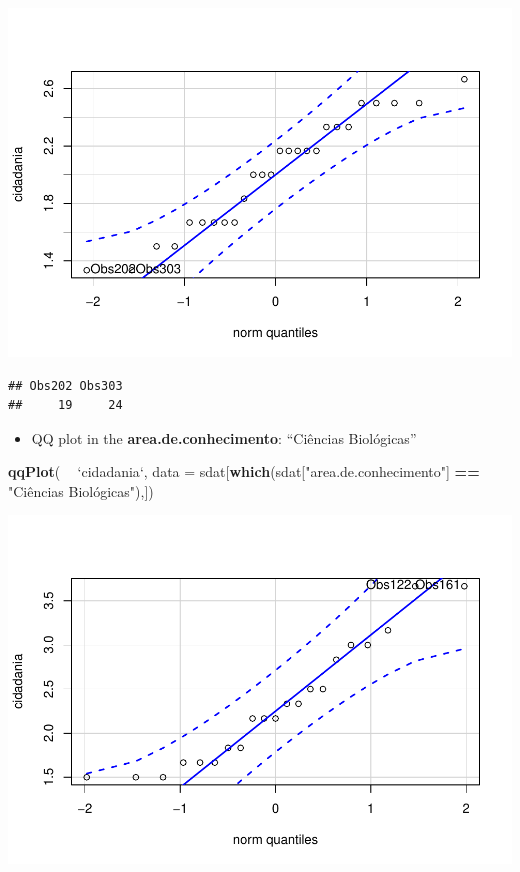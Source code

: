 \documentclass[]{article}
\newenvironment{Shaded}{\begin{snugshade}}{\end{snugshade}}
\newcommand{\DataTypeTok}[1]{\textcolor[rgb]{0.13,0.29,0.53}{#1}}
\newcommand{\KeywordTok}[1]{\textcolor[rgb]{0.13,0.29,0.53}{\textbf{#1}}}
\newcommand{\NormalTok}[1]{#1}
\newcommand{\OperatorTok}[1]{\textcolor[rgb]{0.81,0.36,0.00}{\textbf{#1}}}
\newcommand{\StringTok}[1]{\textcolor[rgb]{0.31,0.60,0.02}{#1}}
\providecommand{\tightlist}{%
  \setlength{\itemsep}{0pt}\setlength{\parskip}{0pt}}
\begin{document}
\includegraphics{factorialAnova_files/figure-latex/unnamed-chunk-22-1.pdf}

\begin{verbatim}
## Obs202 Obs303 
##     19     24
\end{verbatim}

\begin{itemize}
\tightlist
\item
  QQ plot in the \textbf{area.de.conhecimento}: ``Ciências Biológicas''
\end{itemize}

\begin{Shaded}
\begin{Highlighting}[]
\KeywordTok{qqPlot}\NormalTok{( }\OperatorTok{~}\StringTok{ `}\DataTypeTok{cidadania}\StringTok{`}\NormalTok{, }\DataTypeTok{data =}\NormalTok{ sdat[}\KeywordTok{which}\NormalTok{(sdat[}\StringTok{"area.de.conhecimento"}\NormalTok{] }\OperatorTok{==}\StringTok{ "Ciências Biológicas"),])}
\end{Highlighting}
\end{Shaded}

\includegraphics{factorialAnova_files/figure-latex/unnamed-chunk-23-1.pdf}
\end{document}
